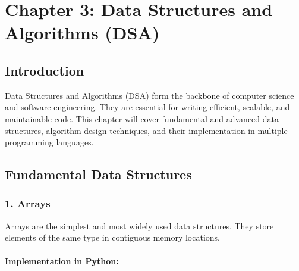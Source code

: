 

\hypertarget{chapter-3-data-structures-and-algorithms-dsa}{%
\section{Chapter 3: Data Structures and Algorithms
(DSA)}\label{chapter-3-data-structures-and-algorithms-dsa}}

\hypertarget{introduction}{%
\subsection{Introduction}\label{introduction}}

Data Structures and Algorithms (DSA) form the backbone of computer
science and software engineering. They are essential for writing
efficient, scalable, and maintainable code. This chapter will cover
fundamental and advanced data structures, algorithm design techniques,
and their implementation in multiple programming languages.

\hypertarget{fundamental-data-structures}{%
\subsection{Fundamental Data
Structures}\label{fundamental-data-structures}}

\hypertarget{arrays}{%
\subsubsection{1. Arrays}\label{arrays}}

Arrays are the simplest and most widely used data structures. They store
elements of the same type in contiguous memory locations.

\hypertarget{implementation-in-python}{%
\paragraph{Implementation in Python:}\label{implementation-in-python}}

\begin{Shaded}
\begin{Highlighting}[]
\OperatorTok{=}\NormalTok{ [}\NormalTok{, }\NormalTok{, }\NormalTok{, }\NormalTok{, }\NormalTok{]}

\NormalTok{(arr[}\NormalTok{])  }

\NormalTok{arr[}\NormalTok{] }\OperatorTok{=} 
\end{Highlighting}
\end{Shaded}

